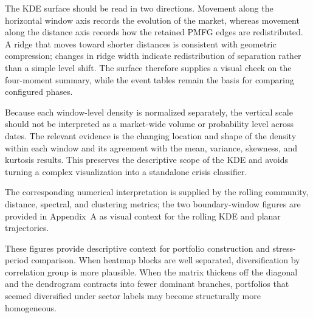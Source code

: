 \documentclass[a4paper,fleqn,review]{cas-sc}
\begin{document}
The KDE surface should be read in two directions. Movement along the horizontal
window axis records the evolution of the market, whereas movement along the
distance axis records how the retained PMFG edges are redistributed. A ridge
that moves toward shorter distances is consistent with geometric compression;
changes in ridge width indicate redistribution of separation rather than a
simple level shift. The surface therefore supplies a visual check on the
four-moment summary, while the event tables remain the basis for comparing
configured phases.

Because each window-level density is normalized separately, the vertical scale
should not be interpreted as a market-wide volume or probability level across
dates. The relevant evidence is the changing location and shape of the density
within each window and its agreement with the mean, variance, skewness, and
kurtosis results. This preserves the descriptive scope of the KDE and avoids
turning a complex visualization into a standalone crisis classifier.

The corresponding numerical interpretation is supplied by the rolling community, distance, spectral, and clustering metrics; the two boundary-window figures are provided in Appendix~A as visual context for the rolling KDE and planar trajectories.

These figures provide descriptive context for portfolio construction and stress-period comparison. When heatmap blocks are well separated, diversification by correlation group is more plausible. When the matrix thickens off the diagonal and the dendrogram contracts into fewer dominant branches, portfolios that seemed diversified under sector labels may become structurally more homogeneous.
\end{document}
